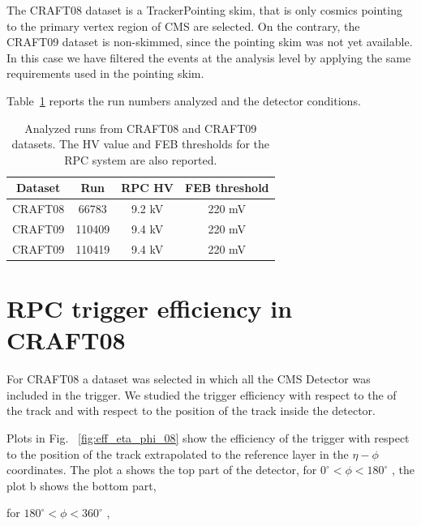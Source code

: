 The CRAFT08 dataset is a TrackerPointing skim, that is 
only cosmics pointing to the primary vertex 
region of CMS are selected. 
On the contrary, the CRAFT09 dataset is non-skimmed, 
since the pointing skim was not yet 
available. In this case we have filtered the 
events at the analysis level by applying the same
requirements used in the pointing skim.

Table~\ref{tab:runs} reports the run numbers analyzed and the detector
conditions.
 \begin{table}[htb]
    \label{tab:runs}
    \begin{center}
      \begin{tabular}{|c|c|c|c|} \hline
Dataset & Run   & RPC HV & FEB threshold \\ \hline
CRAFT08 & 66783 & 9.2 kV & 220 mV \\ \hline
CRAFT09 & 110409  & 9.4 kV & 220 mV \\ \hline
CRAFT09 & 110419  & 9.4 kV & 220 mV \\ \hline
      \end{tabular}
      \caption{Analyzed runs from CRAFT08 
and CRAFT09 datasets. The HV value and FEB thresholds for
the RPC system are also reported.}
    \end{center}
  \end{table}


\section{RPC trigger efficiency in CRAFT08}

For CRAFT08 a dataset was selected in which all the CMS Detector
 was included in the trigger. We studied the trigger efficiency 
with respect to the \pt of the track and with respect to the position 
of the track inside the detector.

Plots in Fig. ~\ref{fig:eff_eta_phi_08} show the efficiency of the trigger with respect to the 
position of the track extrapolated to the reference layer in the $\eta - \phi$
coordinates. The plot a shows the top part of the detector,
for $ 0^\circ < \phi < 180^\circ $ , 
the plot b shows the bottom part,

for  $ 180^\circ < \phi < 360^\circ $ , 


